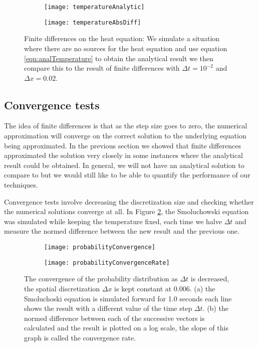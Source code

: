 \begin{figure}
	\begin{subfigure}{0.49\textwidth}
	\texttt{[image: temperatureAnalytic]}
	\end{subfigure}
	\begin{subfigure}{0.49\textwidth}
	\texttt{[image: temperatureAbsDiff]}
	\end{subfigure}
	\caption{Finite differences on the heat equation: We simulate a situation where there are no sources for the heat equation and use equation \ref{eqn:analTemperature} to obtain the analytical result we then compare this to the result of finite differences with $\Delta t = 10^{-2}$ and $\Delta x = 0.02$. \label{fig:temperatureCompare}}
\end{figure}

\subsection{Convergence tests}
The idea of finite differences is that as the step size goes to zero, the numerical approximation will converge on the correct solution to the underlying equation being approximated. In the previous section we showed that finite differences approximated the solution very closely in some instances where the analytical result could be obtained. In general, we will not have an analytical solution to compare to but we would still like to be able to quantify the performance of our techniques.

Convergence tests involve decreasing the discretization size and checking whether the numerical solutions converge at all. In Figure \ref{fig:Convergence}, the Smoluchowski equation was simulated while keeping the temperature fixed, each time we halve $\Delta t$ and measure the normed difference between the new result and the previous one.


\begin{figure}[tb]
	\begin{subfigure}{0.49\textwidth}
		\texttt{[image: probabilityConvergence]}
	\end{subfigure}
	\begin{subfigure}{0.49\textwidth}
		\texttt{[image: probabilityConvergenceRate]}
	\end{subfigure}
\caption{The convergence of the probability distribution as $\Delta t$ is decreased, the spatial discretization $\Delta x$ is kept constant at 0.006. (a) the Smoluchoski equation is simulated forward for 1.0 seconds each line shows the result with a different value of the time step $\Delta t$. (b) the normed difference between each of the successive vectors is calculated and the result is plotted on  a log scale, the slope of this graph is called the convergence rate.}
\label{fig:Convergence}
\end{figure}

